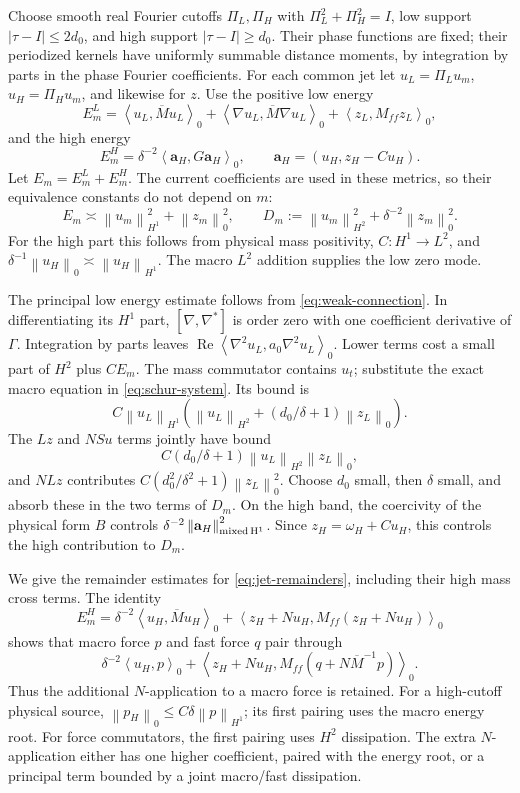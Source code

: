 \documentclass[11pt,a4paper]{article}
\numberwithin{equation}{section}
\theoremstyle{remark}
\newcommand{\norm}[1]{\left\lVert #1\right\rVert}
\newcommand{\ip}[2]{\left\langle #1,#2\right\rangle_0}
\begin{document}
Choose smooth real Fourier cutoffs \(\Pi_L,\Pi_H\) with
\(\Pi_L^2+\Pi_H^2=I\), low support \(|\tau-I|\leq2d_0\), and high
support \(|\tau-I|\geq d_0\). Their phase functions are fixed; their
periodized kernels have uniformly summable distance moments, by
integration by parts in the phase Fourier coefficients.
For each common jet let \(u_L=\Pi_Lu_m\), \(u_H=\Pi_Hu_m\),
and likewise for \(z\). Use the positive low energy
\[
 E_m^L=\ip{u_L}{\overline M u_L}
       +\ip{\nabla u_L}{\overline M\nabla u_L}
       +\ip{z_L}{M_{ff}z_L},
\]
and the high energy
\begin{equation}\label{eq:high-energy}
 E_m^H=\delta^{-2}\ip{\mathbf a_H}{G\mathbf a_H},
 \qquad \mathbf a_H=(u_H,z_H-Cu_H).
\end{equation}
Let \(E_m=E_m^L+E_m^H\). The current coefficients are used in these
metrics, so their equivalence constants do not depend on \(m\):
\begin{equation}\label{eq:base-energy}
 E_m\asymp\norm{u_m}_{H^1}^2+\norm{z_m}_0^2,\qquad
 D_m:=\norm{u_m}_{H^2}^2+\delta^{-2}\norm{z_m}_0^2 .
\end{equation}
For the high part this follows from physical mass positivity,
\(C:H^1\to L^2\), and
\(\delta^{-1}\norm{u_H}_0\asymp\norm{u_H}_{H^1}\).
The macro \(L^2\) addition supplies the low zero mode.

The principal low energy estimate follows from
\eqref{eq:weak-connection}. In differentiating its \(H^1\) part,
\([\nabla,\nabla^*]\) is order zero with one coefficient derivative
of \(\Gamma\). Integration by parts leaves
\(\operatorname{Re}\ip{\nabla^2u_L}{a_0\nabla^2u_L}\).
Lower terms cost a small part of \(H^2\) plus \(CE_m\).
The mass commutator contains \(u_t\); substitute the exact macro
equation in \eqref{eq:schur-system}. Its bound is
\[
 C\norm{u_L}_{H^1}
      \left(\norm{u_L}_{H^2}
                         +(d_0/\delta+1)\norm{z_L}_0\right).
\]
The \(Lz\) and \(NSu\) terms jointly have bound
\[
 C(d_0/\delta+1)\norm{u_L}_{H^2}\norm{z_L}_0,
\]
and \(NLz\) contributes
\(C(d_0^2/\delta^2+1)\norm{z_L}_0^2\).
Choose \(d_0\) small, then \(\delta\) small, and absorb these in
the two terms of \(D_m\).
On the high band, the coercivity of the physical form \(B\)
controls \(\delta^{-2}\norm{\mathbf a_H}_{\rm mixed\,H^1}^2\).
Since \(z_H=\omega_H+Cu_H\), this controls the high contribution
to \(D_m\).

We give the remainder estimates for \eqref{eq:jet-remainders},
including their high mass cross terms. The identity
\begin{equation}\label{eq:high-mass-square}
 E_m^H=\delta^{-2}\ip{u_H}{\overline M u_H}
             +\ip{z_H+Nu_H}{M_{ff}(z_H+Nu_H)}
\end{equation}
shows that macro force \(p\) and fast force \(q\) pair through
\[
 \delta^{-2}\ip{u_H}{p}
       +\ip{z_H+Nu_H}{M_{ff}(q+N\overline M^{-1}p)}.
\]
Thus the additional \(N\)-application to a macro force is retained.
For a high-cutoff physical source,
\(\norm{p_H}_0\leq C\delta\norm p_{H^1}\); its first pairing uses
the macro energy root. For force commutators, the first pairing
uses \(H^2\) dissipation. The extra \(N\)-application either has
one higher coefficient, paired with the energy root, or a
principal term bounded by a joint macro/fast dissipation.
\end{document}
